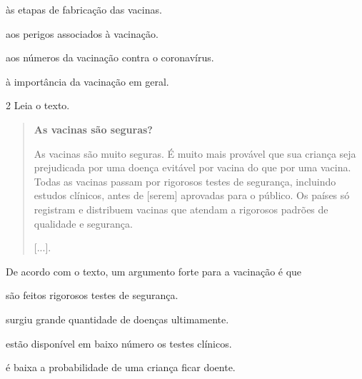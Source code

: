 \begin{escolha}
\item às etapas de fabricação das vacinas.

\item aos perigos associados à vacinação.

\item aos números da vacinação contra o coronavírus.

\item à importância da vacinação em geral.
\end{escolha}
\pagebreak

\num{2} Leia o texto.

\begin{quote}
\textbf{As vacinas são seguras?}

As vacinas são muito seguras. É muito mais provável que sua criança seja
prejudicada por uma doença evitável por vacina do que por uma vacina.
Todas as vacinas passam por rigorosos testes de segurança, incluindo
estudos clínicos, antes de {[}serem{]} aprovadas para o público. Os países só
registram e distribuem vacinas que atendam a rigorosos padrões de
qualidade e segurança.

{[}...{]}.

\end{quote}

De acordo com o texto, um argumento forte para a vacinação é que

\begin{escolha}
\item são feitos rigorosos testes de segurança.

\item surgiu grande quantidade de doenças ultimamente.

\item estão disponível em baixo número os testes clínicos.

\item é baixa a probabilidade de uma criança ficar doente.
\end{escolha}

